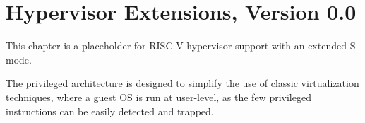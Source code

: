 \chapter{Hypervisor Extensions, Version 0.0}
\label{hypervisor}

This chapter is a placeholder for RISC-V hypervisor support with an
extended S-mode.

\begin{commentary}
The privileged architecture is designed to simplify the use of classic
virtualization techniques, where a guest OS is run at user-level, as
the few privileged instructions can be easily detected and trapped.
\end{commentary}
